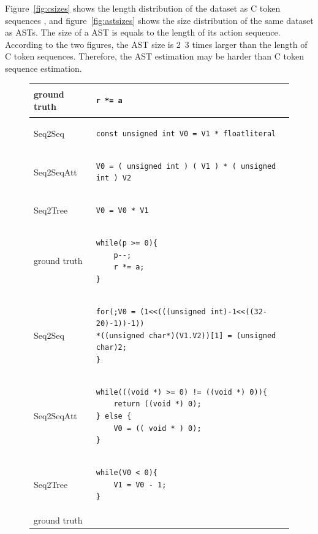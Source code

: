 \documentclass[senior,final,11pt]{iscs-thesis}
\begin{document}
Figure~\ref{fig:csizes} shows the length distribution of the dataset as C token sequences
, and figure~\ref{fig:astsizes} shows the size distribution of the same dataset as ASTs.
The size of a AST is equals to the length of its action sequence.
According to the two figures, the AST size is 2~3 times larger than the length of C token sequences.
Therefore, the AST estimation may be harder than C token sequence estimation.

\begin{figure}
	\begin{tabular}{|l|l|} \hline
	 ground truth & 
		\begin{lstlisting}[style=Csample]
r *= a
		\end{lstlisting} \\ \hline
		Seq2Seq & 
		\begin{lstlisting}[style=Csample]
const unsigned int V0 = V1 * floatliteral
		\end{lstlisting} \\ \hline
		Seq2SeqAtt & 
		\begin{lstlisting}[style=Csample]
V0 = ( unsigned int ) ( V1 ) * ( unsigned int ) V2
		\end{lstlisting} \\ \hline
		Seq2Tree & 
		\begin{lstlisting}[style=Csample]
V0 = V0 * V1
		\end{lstlisting} \\ \hline
		\hline	
	 ground truth & 
		\begin{lstlisting}[style=Csample]
while(p >= 0){
	p--;
	r *= a;
}
		\end{lstlisting} \\ \hline
		Seq2Seq & 
		\begin{lstlisting}[style=Csample]
for(;V0 = (1<<(((unsigned int)-1<<((32-20)-1))-1))
*((unsigned char*)(V1.V2))[1] = (unsigned char)2;
}
		\end{lstlisting} \\ \hline
		Seq2SeqAtt & 
		\begin{lstlisting}[style=Csample]
while(((void *) >= 0) != ((void *) 0)){ 
	return ((void *) 0);
} else { 
	V0 = (( void * ) 0); 
}
		\end{lstlisting} \\ \hline
		Seq2Tree & 
		\begin{lstlisting}[style=Csample]
while(V0 < 0){ 
	V1 = V0 - 1;
}
		\end{lstlisting}
		 \\ \hline	\hline
	 ground truth & 

\end{tabular}
\end{figure}
\end{document}
